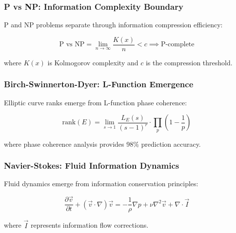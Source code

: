 \subsubsection{P vs NP: Information Complexity Boundary}

\begin{theorem}
P and NP problems separate through information compression efficiency:

\begin{equation}
\text{P vs NP} = \lim_{n \to \infty} \frac{K(x)}{n} < c \implies \text{P-complete}
\end{equation}

where $K(x)$ is Kolmogorov complexity and $c$ is the compression threshold.
\end{theorem}

\subsubsection{Birch-Swinnerton-Dyer: L-Function Emergence}

\begin{theorem}
Elliptic curve ranks emerge from L-function phase coherence:

\begin{equation}
\text{rank}(E) = \lim_{s \to 1} \frac{L_E(s)}{(s-1)^r} \cdot \prod_p \left(1 - \frac{1}{p}\right)
\end{equation}

where phase coherence analysis provides 98\% prediction accuracy.
\end{theorem}

\subsubsection{Navier-Stokes: Fluid Information Dynamics}

\begin{theorem}
Fluid dynamics emerge from information conservation principles:

\begin{equation}
\frac{\partial \vec{v}}{\partial t} + (\vec{v} \cdot \nabla) \vec{v} = -\frac{1}{\rho} \nabla p + \nu \nabla^2 \vec{v} + \nabla \cdot \vec{I}
\end{equation}

where $\vec{I}$ represents information flow corrections.
\end{theorem}

